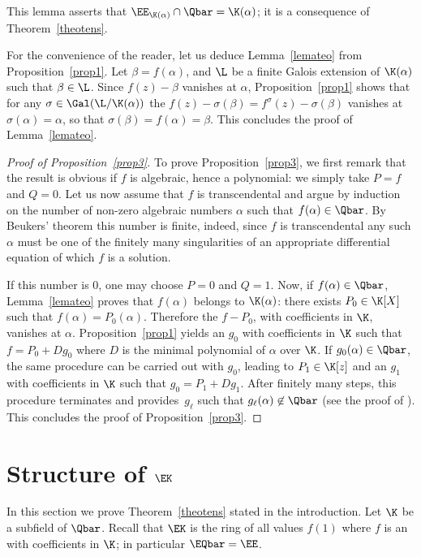 This lemma asserts that $\EE_{\K(\alpha)}\cap\Qbar=\K(\alpha)$; it is a consequence of Theorem~\ref{theotens}.

For the convenience of the reader, let us deduce Lemma~\ref{lemateo} from Proposition~\ref{prop1}. Let $\beta = f(\alpha)$, and $\L$ be a finite Galois extension of $\K(\alpha)$ such that $\beta\in\L$. Since $f(z)-\beta$ vanishes at $\alpha$, Proposition~\ref{prop1} shows that for any $\sigma\in \Gal(\L/\K(\alpha))$
the \Efunction $f(z)-\sigma(\beta) = f^\sigma(z)-\sigma(\beta) $ vanishes at $\sigma(\alpha)=\alpha$, so that $ \sigma(\beta) =f(\alpha) = \beta$.
This concludes the proof of Lemma~\ref{lemateo}.

\begin{proof}[Proof of Proposition~\ref{prop3}] To prove Proposition~\ref{prop3}, we first remark that the result is obvious if $f$ is algebraic, hence a polynomial: we simply take $P=f$ and $Q=0$. Let us now assume that $f$ is transcendental and argue by induction on the number of non-zero algebraic numbers $\alpha$ such that $f(\alpha)\in \Qbar$. By Beukers' theorem this number is finite, indeed, since $f$ is transcendental any such
$\alpha$ must be one of the finitely many singularities of an appropriate differential equation of which $f$ is a solution.

If this number is 0, one may choose $P=0$ and $Q=1$. Now, if $f(\alpha)\in \Qbar$, Lemma~\ref{lemateo} proves that $ f(\alpha)$ belongs to $\K(\alpha) $: there exists $P_0\in\K[X]$ such that $ f(\alpha) = P_0(\alpha)$. Therefore the \Efunction $f-P_0$, with coefficients in $\K$, vanishes at $\alpha$. Proposition~\ref{prop1} yields an \Efunction $g_0$ with coefficients in $\K$ such that $f = P_0 + D g_0$ where $D $ is the minimal polynomial of $\alpha$ over $\K$. If $g_0(\alpha)\in\Qbar$, the same procedure can be carried out with $g_0$, leading to $P_1\in\K[z]$ and an \Efunction $g_1$ with coefficients in $\K$ such that $g_0=P_1+Dg_1$. After finitely many steps, this procedure terminates and provides~$g_\ell$ such that $g_\ell(\alpha)\not\in\Qbar$ (see the proof of \cite[Th.\,3.4]{BRS2}). This concludes the proof of Proposition~\ref{prop3}. \end{proof}

\section{Structure of \texorpdfstring{$\EK$}{EK}} \label{sec5}

In this section we prove Theorem~\ref{theotens} stated in the introduction.
Let $\K$ be a subfield of $\Qbar$. Recall that $\EK$ is the ring of all values $f(1)$ where $f$ is an \Efunction with coefficients in $\K$; in particular $\EQbar = \EE$.

